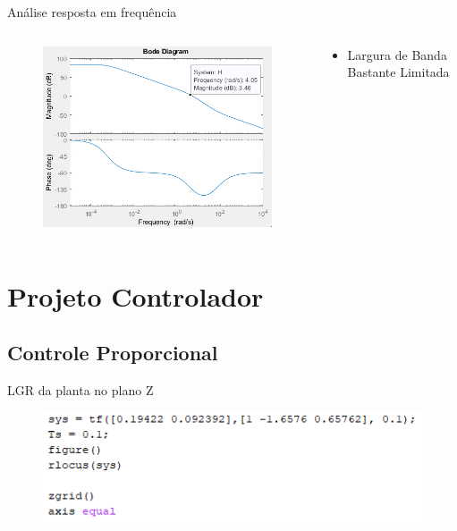 \documentclass{beamer}
\begin{document}
\begin{frame}{Análise resposta em frequência}
\begin{columns}
\begin{column}{0.6\textwidth}  %
\begin{figure}
    \centering
    \includegraphics[width = 1.1\linewidth]{src/tex/img/bode.PNG}
\end{figure}
\end{column}
\begin{column}{0.4\textwidth}
\begin{itemize}
    \item Largura de Banda Bastante Limitada
\end{itemize}
\end{column}
\end{columns}
\end{frame}

\section{Projeto Controlador}
\subsection{Controle Proporcional}


\begin{frame}{LGR da planta no plano Z}
\begin{figure}
    \centering
    \includegraphics[width = \linewidth]{src/tex/img/script.PNG}
    \caption{}
    \label{fig:control_1}
\end{figure}
\end{frame}
\end{document}
